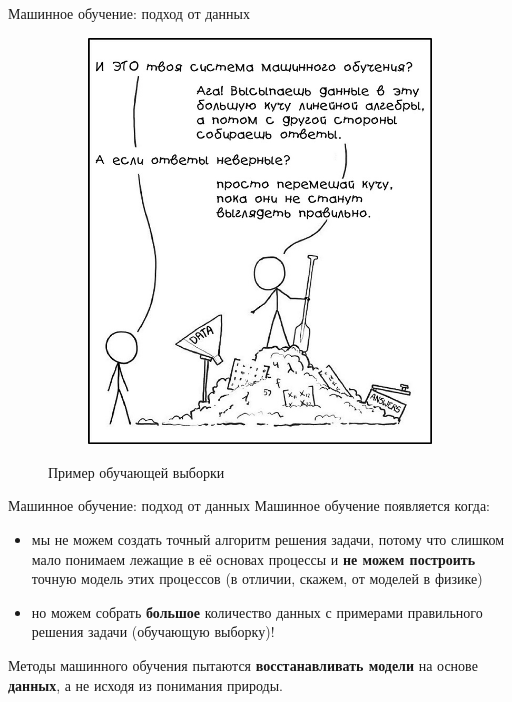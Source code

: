 \documentclass[aspectratio=169]{beamer}
\begin{document}
\begin{frame}{Машинное обучение: подход от данных}
\begin{figure}
\begin{subfigure}[b]{0.1\linewidth}
        \end{subfigure}
        \begin{subfigure}[b]{0.1\linewidth}
            \includegraphics[width=\linewidth]{graphs/fig35.jpg}
        \end{subfigure}
        \caption{Пример обучающей выборки}
    \end{figure}
\end{frame}

\begin{frame}{Машинное обучение: подход от данных}
    Машинное обучение появляется когда:
    \begin{itemize}
        \item мы не можем создать точный алгоритм решения задачи, потому что
         слишком мало понимаем лежащие в её основах процессы и
          \textbf{не можем построить} точную модель этих процессов (в отличии,
           скажем, от моделей в физике)
         \pause{}
         \item но можем собрать \textbf{большое} количество данных с примерами
          правильного решения задачи (обучающую выборку)! 
    \end{itemize}
    \pause{}
    Методы машинного обучения пытаются \textbf{восстанавливать модели} на
     основе \textbf{данных}, а не исходя из понимания природы.
\end{frame}
\end{document}
